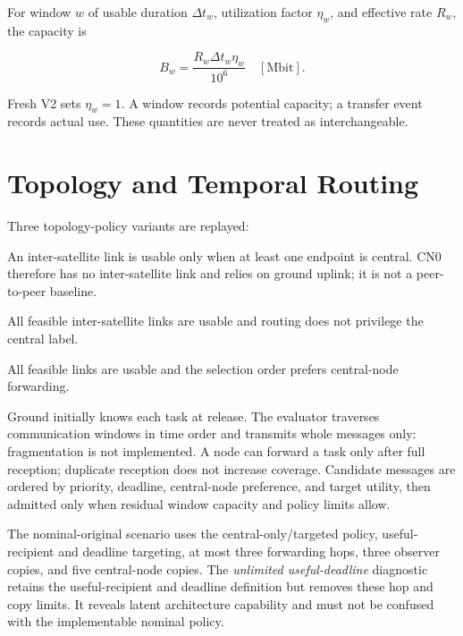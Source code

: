For window $w$ of usable duration $\Delta t_w$, utilization factor $\eta_w$, and effective rate $R_w$, the capacity is

\begin{equation}
B_w=\frac{R_w\Delta t_w\eta_w}{10^6}\quad[\mathrm{Mbit}].
\label{eq:window_capacity}
\end{equation}

Fresh V2 sets $\eta_w=1$. A window records potential capacity; a transfer event records actual use. These quantities are never treated as interchangeable.

\section{Topology and Temporal Routing}

Three topology-policy variants are replayed:

\begin{description}[leftmargin=3.0cm,style=nextline]
\item[Central-only] An inter-satellite link is usable only when at least one endpoint is central. CN0 therefore has no inter-satellite link and relies on ground uplink; it is not a peer-to-peer baseline.
\item[Peer-only] All feasible inter-satellite links are usable and routing does not privilege the central label.
\item[Hybrid] All feasible links are usable and the selection order prefers central-node forwarding.
\end{description}

Ground initially knows each task at release. The evaluator traverses communication windows in time order and transmits whole messages only: fragmentation is not implemented. A node can forward a task only after full reception; duplicate reception does not increase coverage. Candidate messages are ordered by priority, deadline, central-node preference, and target utility, then admitted only when residual window capacity and policy limits allow.

The nominal-original scenario uses the central-only/targeted policy, useful-recipient and deadline targeting, at most three forwarding hops, three observer copies, and five central-node copies. The \emph{unlimited useful-deadline} diagnostic retains the useful-recipient and deadline definition but removes these hop and copy limits. It reveals latent architecture capability and must not be confused with the implementable nominal policy.

